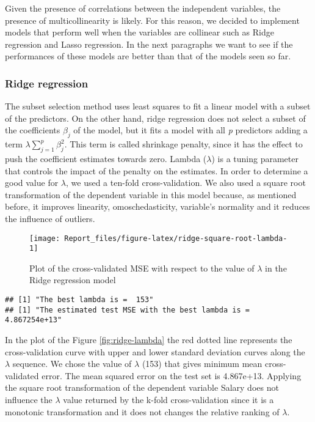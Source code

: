 \documentclass[
]{article}
\begin{document}
Given the presence of correlations between the independent variables,
the presence of multicollinearity is likely. For this reason, we decided
to implement models that perform well when the variables are collinear
such as Ridge regression and Lasso regression. In the next paragraphs we
want to see if the performances of these models are better than that of
the models seen so far.

\hypertarget{ridge-regression}{%
\subsubsection{Ridge regression}\label{ridge-regression}}

The subset selection method uses least squares to fit a linear model
with a subset of the predictors. On the other hand, ridge regression
does not select a subset of the coefficients \emph{\(\beta_j\)} of the
model, but it fits a model with all \emph{p} predictors adding a term
\(\lambda \sum^p_{j=1} \beta^2_j\). This term is called shrinkage
penalty, since it has the effect to push the coefficient estimates
towards zero. Lambda (\(\lambda\)) is a tuning parameter that controls
the impact of the penalty on the estimates. In order to determine a good
value for \(\lambda\), we used a ten-fold cross-validation. We also used
a square root transformation of the dependent variable in this model
because, as mentioned before, it improves linearity, omoschedasticity,
variable's normality and it reduces the influence of outliers.

\begin{figure}

{\centering \texttt{[image: Report\_files/figure-latex/ridge-square-root-lambda-1]} 

}

\caption{Plot of the cross-validated MSE with respect to the value of $\lambda$ in the Ridge regression model \label{fig:ridge-lambda}}\label{fig:ridge-square-root-lambda}
\end{figure}

\begin{verbatim}
## [1] "The best lambda is =  153"
## [1] "The estimated test MSE with the best lambda is =  4.867254e+13"
\end{verbatim}

In the plot of the Figure \ref{fig:ridge-lambda} the red dotted line
represents the cross-validation curve with upper and lower standard
deviation curves along the \(\lambda\) sequence. We chose the value of
\(\lambda\) (153) that gives minimum mean cross-validated error. The
mean squared error on the test set is 4.867e+13. Applying the square
root transformation of the dependent variable Salary does not influence
the \(\lambda\) value returned by the k-fold cross-validation since it
is a monotonic transformation and it does not changes the relative
ranking of \(\lambda\).
\end{document}
